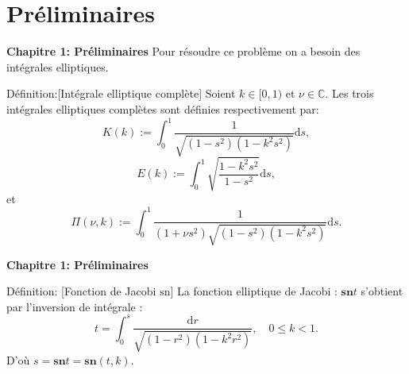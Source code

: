 \documentclass[mathserif,10pt]{beamer}
\begin{document}
\section{Préliminaires}
\begin{frame}{}\transglitter[duration=1]
\begin{center}
\end{center}
\end{frame}
\begin{frame}{\textbf{Chapitre 1: Préliminaires}  }\transglitter[duration=1]
Pour résoudre ce problème  on a besoin des intégrales elliptiques.

\begin{block}{Définition:[Intégrale elliptique complète]}
Soient $k \in [0,1)$ et $\nu \in \mathbb{C}$. Les trois  intégrales elliptiques complètes sont définies respectivement par:
\begin{equation}
K(k):=\displaystyle\int_{0}^{1}\dfrac{1}{\sqrt{(1-s^{2})(1-k^{2}s^{2})}} \mathrm{d}s,
\end{equation}
\begin{equation}
E(k):= \displaystyle\int_{0}^{1}\sqrt{\dfrac{1-k^{2}s^{2}}{1-s^{2}}}\mathrm{d}s,
\end{equation}
et
\begin{equation}
\Pi(\nu ,k):=\int_{0}^{1}\dfrac{1}{(1+\nu s^{2})\sqrt{(1-s^{2})(1-k^{2}s^{2})}}\mathrm{d}s.
\end{equation}
\end{block}
\end{frame}
\begin{frame}{\textbf{Chapitre 1: Préliminaires}}\transglitter[duration=1]
\begin{block}{Définition: [Fonction de Jacobi $\mathrm{sn}$]}
 La fonction elliptique de Jacobi : $\mathbf{sn} t$  s'obtient par l'inversion  de intégrale :
 $$
 t =\displaystyle\int_{0}^{s}\dfrac{\mathrm{d}r}{\sqrt{(1-r^{2})(1-k^{2}r^{2})}}, \quad 0\leq k <1.
 $$
 D'o\`u  $ s = \mathbf{sn} t = \mathbf{sn}(t,k)$.
\end{block}
\end{frame}
\end{document}

